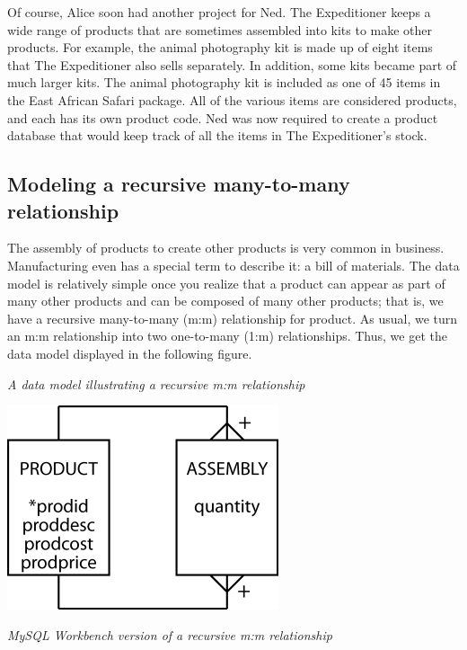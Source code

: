 \documentclass[
]{article}
\begin{document}
Of course, Alice soon had another project for Ned. The Expeditioner
keeps a wide range of products that are sometimes assembled into kits to
make other products. For example, the animal photography kit is made up
of eight items that The Expeditioner also sells separately. In addition,
some kits became part of much larger kits. The animal photography kit is
included as one of 45 items in the East African Safari package. All of
the various items are considered products, and each has its own product
code. Ned was now required to create a product database that would keep
track of all the items in The Expeditioner's stock.

\hypertarget{modeling-a-recursive-many-to-many-relationship}{%
\subsection*{Modeling a recursive many-to-many relationship}\label{modeling-a-recursive-many-to-many-relationship}}

The assembly of products to create other products is very common in
business. Manufacturing even has a special term to describe it: a bill
of materials. The data model is relatively simple once you realize that
a product can appear as part of many other products and can be composed
of many other products; that is, we have a recursive many-to-many (m:m)
relationship for product. As usual, we turn an m:m relationship into two
one-to-many (1:m) relationships. Thus, we get the data model displayed
in the following figure.

\emph{A data model illustrating a recursive m:m relationship}

\includegraphics[width=3.14583in,height=\textheight]{Figures/Chapter 6/recursive-m-and-m.png}

\emph{MySQL Workbench version of a recursive m:m relationship}
\end{document}
